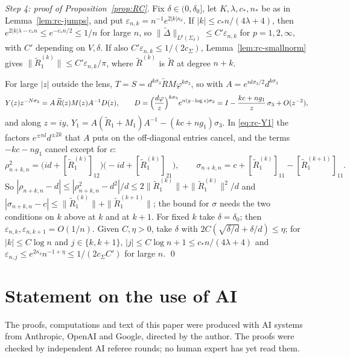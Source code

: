 \documentclass[11pt]{amsart}
\theoremstyle{definition}
\theoremstyle{remark}
\numberwithin{equation}{section}
\newcommand{\eps}{\varepsilon}
\begin{document}
\emph{Step 4: proof of Proposition~\ref{prop:RC}.} Fix $\delta\in(0,\delta_0]$, let $K,\lambda,c_*,n_*$ be as in Lemma~\ref{lem:rc-jumps}, and put $\eps_{n,k}=n^{-1}e^{2|k|\kappa_\delta}$. If $|k|\le c_*n/(4\lambda+4)$, then $e^{2|k|\lambda-c_*n}\le e^{-c_*n/2}\le1/n$ for large $n$, so $\|\widetilde\Delta\|_{L^p(\Sigma_\delta)}\le C'\eps_{n,k}$ for $p=1,2,\infty$, with $C'$ depending on $V,\delta$. If also $C'\eps_{n,k}\le1/(2c_\Sigma)$, Lemma~\ref{lem:rc-smallnorm} gives $\|\widetilde R_1^{(k)}\|\le C'\eps_{n,k}/\pi$, where $\widetilde R^{(k)}$ is $\widetilde R$ at degree $n+k$.

For large $|z|$ outside the lens, $T=S=d^{k\sigma_3}\widetilde RM\varphi^{k\sigma_3}$, so with $A=e^{nl\sigma_3/2}d^{k\sigma_3}$
\[
Y(z)z^{-N\sigma_3}=A\,\widetilde R(z)M(z)A^{-1}D(z),\qquad D=\Bigl(\frac{d\varphi}z\Bigr)^{k\sigma_3}e^{n(g-\log z)\sigma_3}=I-\frac{kc+ng_1}z\,\sigma_3+O(z^{-2}),
\]
and along $z=iy$, $Y_1=A(\widetilde R_1+M_1)A^{-1}-(kc+ng_1)\sigma_3$. In \eqref{eq:rc-Y1} the factors $e^{\pm nl}d^{\pm2k}$ that $A$ puts on the off-diagonal entries cancel, and the terms $-kc-ng_1$ cancel except for $c$:
\[
\rho_{n+k,n}^2=\bigl(id+[\widetilde R_1^{(k)}]_{12}\bigr)\bigl(-id+[\widetilde R_1^{(k)}]_{21}\bigr),\qquad
\sigma_{n+k,n}=c+[\widetilde R_1^{(k)}]_{11}-[\widetilde R_1^{(k+1)}]_{11}.
\]
So $|\rho_{n+k,n}-d|\le|\rho_{n+k,n}^2-d^2|/d\le2\|\widetilde R_1^{(k)}\|+\|\widetilde R_1^{(k)}\|^2/d$ and $|\sigma_{n+k,n}-c|\le\|\widetilde R_1^{(k)}\|+\|\widetilde R_1^{(k+1)}\|$; the bound for $\sigma$ needs the two conditions on $k$ above at $k$ and at $k+1$. For fixed $k$ take $\delta=\delta_0$; then $\eps_{n,k},\eps_{n,k+1}=O(1/n)$. Given $C,\eta>0$, take $\delta$ with $2C(\sqrt{\delta/d}+\delta/d)\le\eta$; for $|k|\le C\log n$ and $j\in\{k,k+1\}$, $|j|\le C\log n+1\le c_*n/(4\lambda+4)$ and $\eps_{n,j}\le e^{2\kappa_\delta}n^{-1+\eta}\le1/(2c_\Sigma C')$ for large $n$. \qed


\section*{Statement on the use of AI}
The proofs, computations and text of this paper were produced with AI systems from Anthropic, OpenAI and Google, directed by the author. The proofs were checked by independent AI referee rounds; no human expert has yet read them.
\end{document}
